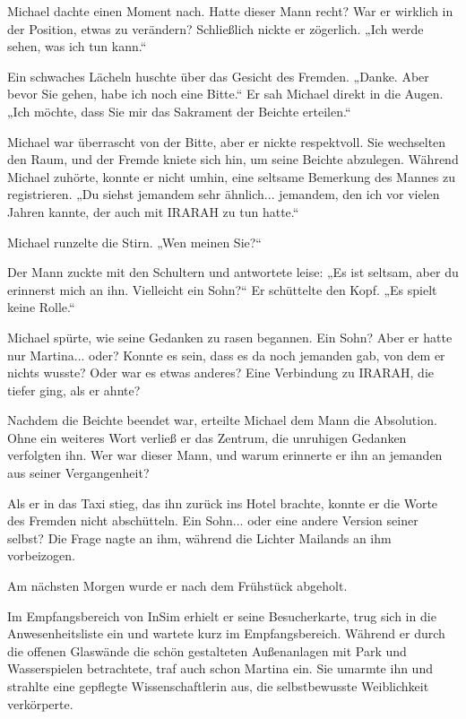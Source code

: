 \documentclass[
]{article}
\begin{document}
Michael dachte einen Moment nach. Hatte dieser Mann recht? War er
wirklich in der Position, etwas zu verändern? Schließlich nickte er
zögerlich. „Ich werde sehen, was ich tun kann.``

Ein schwaches Lächeln huschte über das Gesicht des Fremden. „Danke. Aber
bevor Sie gehen, habe ich noch eine Bitte.`` Er sah Michael direkt in
die Augen. „Ich möchte, dass Sie mir das Sakrament der Beichte
erteilen.``

Michael war überrascht von der Bitte, aber er nickte respektvoll. Sie
wechselten den Raum, und der Fremde kniete sich hin, um seine Beichte
abzulegen. Während Michael zuhörte, konnte er nicht umhin, eine seltsame
Bemerkung des Mannes zu registrieren. „Du siehst jemandem sehr
ähnlich... jemandem, den ich vor vielen Jahren kannte, der auch mit
IRARAH zu tun hatte.``

Michael runzelte die Stirn. „Wen meinen Sie?{\kern0pt}``

Der Mann zuckte mit den Schultern und antwortete leise: „Es ist seltsam,
aber du erinnerst mich an ihn. Vielleicht ein Sohn?{\kern0pt}`` Er
schüttelte den Kopf. „Es spielt keine Rolle.``

Michael spürte, wie seine Gedanken zu rasen begannen. Ein Sohn? Aber er
hatte nur Martina... oder? Konnte es sein, dass es da noch jemanden gab,
von dem er nichts wusste? Oder war es etwas anderes? Eine Verbindung zu
IRARAH, die tiefer ging, als er ahnte?

Nachdem die Beichte beendet war, erteilte Michael dem Mann die
Absolution. Ohne ein weiteres Wort verließ er das Zentrum, die unruhigen
Gedanken verfolgten ihn. Wer war dieser Mann, und warum erinnerte er ihn
an jemanden aus seiner Vergangenheit?

Als er in das Taxi stieg, das ihn zurück ins Hotel brachte, konnte er
die Worte des Fremden nicht abschütteln. Ein Sohn... oder eine andere
Version seiner selbst? Die Frage nagte an ihm, während die Lichter
Mailands an ihm vorbeizogen.

Am nächsten Morgen wurde er nach dem Frühstück abgeholt.

Im Empfangsbereich von InSim erhielt er seine Besucherkarte, trug sich
in die Anwesenheitsliste ein und wartete kurz im Empfangsbereich.
Während er durch die offenen Glaswände die schön gestalteten
Außenanlagen mit Park und Wasserspielen betrachtete, traf auch schon
Martina ein. Sie umarmte ihn und strahlte eine gepflegte
Wissenschaftlerin aus, die selbstbewusste Weiblichkeit verkörperte.
\end{document}
